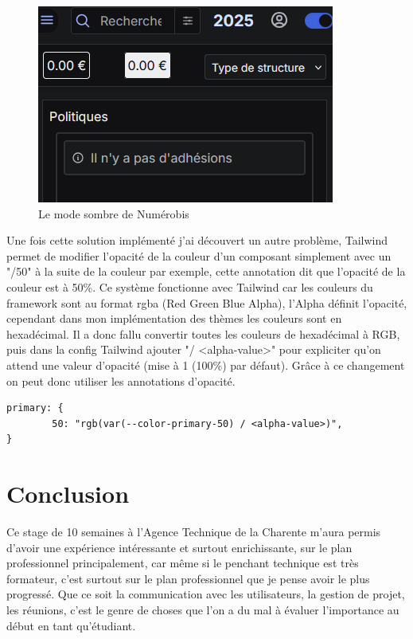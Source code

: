 \documentclass[a4paper,12pt]{report}
\begin{document}
\begin{figure}[H]
    \centering
    \includegraphics[scale=0.5]{exempleDarkmode.png}
    \caption{Le mode sombre de Numérobis}
    \label{fig:dark-mode}
\end{figure}

Une fois cette solution implémenté j'ai découvert un autre problème, Tailwind permet de modifier l'opacité de la couleur d'un composant simplement avec un "/50" à la suite de la couleur par exemple, cette annotation dit que l'opacité de la couleur est à 50\%. Ce système fonctionne avec Tailwind car les couleurs du framework sont au format rgba (Red Green Blue Alpha), l'Alpha définit l'opacité, cependant dans mon implémentation des thèmes les couleurs sont en hexadécimal. Il a donc fallu convertir toutes les couleurs de hexadécimal à RGB, puis dans la config Tailwind ajouter "/ <alpha-value>" pour expliciter qu'on attend une valeur d'opacité (mise à 1 (100\%) par défaut). Grâce à ce changement on peut donc utiliser les annotations d'opacité.

\begin{verbatim}
primary: {
        50: "rgb(var(--color-primary-50) / <alpha-value>)",
}
\end{verbatim}

\chapter{Conclusion}

Ce stage de 10 semaines à l'Agence Technique de la Charente m'aura permis d'avoir une expérience intéressante et surtout enrichissante, sur le plan professionnel principalement, car même si le penchant technique est très formateur, c'est surtout sur le plan professionnel que je pense avoir le plus progressé. Que ce soit la communication avec les utilisateurs, la gestion de projet, les réunions, c'est le genre de choses que l'on a du mal à évaluer l'importance au début en tant qu'étudiant.
\end{document}
